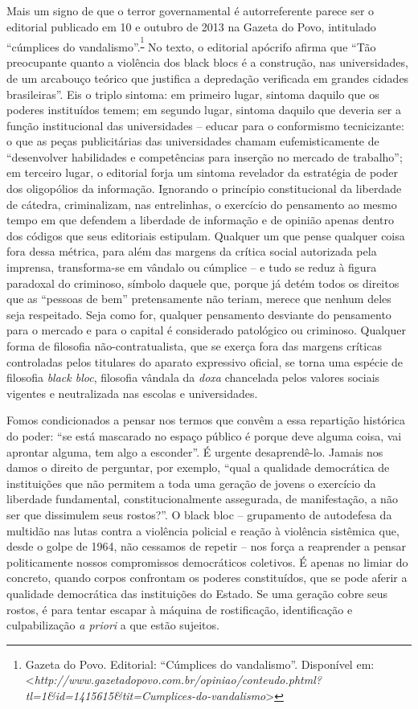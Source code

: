 Mais um signo de que o terror governamental é autorreferente parece ser
o editorial publicado em 10 e outubro de 2013 na Gazeta do Povo,
intitulado ``cúmplices do vandalismo''.\textsuperscript{\footnote{Gazeta
  do Povo. Editorial: ``Cúmplices do vandalismo''. Disponível em:
  \textless{}{\emph{http://www.gazetadopovo.com.br/opiniao/conteudo.phtml?tl=1\&id=1415615\&tit=Cumplices-do-vandalismo}}\textgreater{}}}
No texto, o editorial apócrifo afirma que ``Tão preocupante quanto a
violência dos black blocs é a construção, nas universidades, de um
arcabouço teórico que justifica a depredação verificada em grandes
cidades brasileiras''. Eis o triplo sintoma: em primeiro lugar, sintoma
daquilo que os poderes instituídos temem; em segundo lugar, sintoma
daquilo que deveria ser a função institucional das universidades --
educar para o conformismo tecnicizante: o que as peças publicitárias das
universidades chamam eufemisticamente de ``desenvolver habilidades e
competências para inserção no mercado de trabalho''; em terceiro lugar,
o editorial forja um sintoma revelador da estratégia de poder dos
oligopólios da informação. Ignorando o princípio constitucional da
liberdade de cátedra, criminalizam, nas entrelinhas, o exercício do
pensamento ao mesmo tempo em que defendem a liberdade de informação e de
opinião apenas dentro dos códigos que seus editoriais estipulam.
Qualquer um que pense qualquer coisa fora dessa métrica, para além das
margens da crítica social autorizada pela imprensa, transforma-se em
vândalo ou cúmplice -- e tudo se reduz à figura paradoxal do criminoso,
símbolo daquele que, porque já detém todos os direitos que as ``pessoas
de bem'' pretensamente não teriam, merece que nenhum deles seja
respeitado. Seja como for, qualquer pensamento desviante do pensamento
para o mercado e para o capital é considerado patológico ou criminoso.
Qualquer forma de filosofia não-contratualista, que se exerça fora das
margens críticas controladas pelos titulares do aparato expressivo
oficial, se torna uma espécie de filosofia \emph{black bloc}, filosofia
vândala da \emph{doxa }chancelada pelos valores sociais vigentes e
neutralizada nas escolas e universidades.

Fomos condicionados a pensar nos termos que convêm a essa repartição
histórica do poder: ``se está mascarado no espaço público é porque deve
alguma coisa, vai aprontar alguma, tem algo a esconder''. É urgente
desaprendê-lo. Jamais nos damos o direito de perguntar, por exemplo,
``qual a qualidade democrática de instituições que não permitem a toda
uma geração de jovens o exercício da liberdade fundamental,
constitucionalmente assegurada, de manifestação, a não ser que
dissimulem seus rostos?''. O black bloc -- grupamento de autodefesa da
multidão nas lutas contra a violência policial e reação à violência
sistêmica que, desde o golpe de 1964, não cessamos de repetir -- nos
força a reaprender a pensar politicamente nossos compromissos
democráticos coletivos. É apenas no limiar do concreto, quando corpos
confrontam os poderes constituídos, que se pode aferir a qualidade
democrática das instituições do Estado. Se uma geração cobre seus
rostos, é para tentar escapar à máquina de rostificação, identificação e
culpabilização \emph{a priori} a que estão sujeitos.


